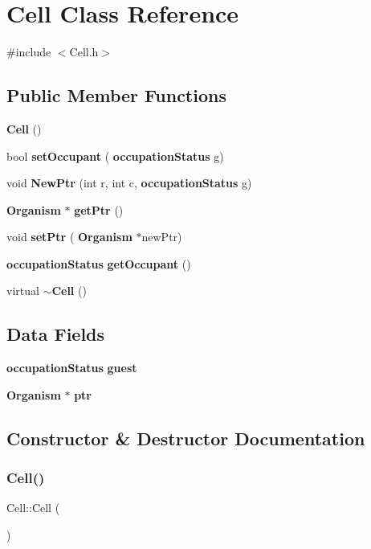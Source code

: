 \section{Cell Class Reference}
\label{classCell}


{\ttfamily \#include $<$Cell.\+h$>$}

\subsection*{Public Member Functions}
\begin{DoxyCompactItemize}
\item 
\textbf{ Cell} ()
\item 
bool \textbf{ set\+Occupant} (\textbf{ occupation\+Status} g)
\item 
void \textbf{ New\+Ptr} (int r, int c, \textbf{ occupation\+Status} g)
\item 
\textbf{ Organism} $\ast$ \textbf{ get\+Ptr} ()
\item 
void \textbf{ set\+Ptr} (\textbf{ Organism} $\ast$new\+Ptr)
\item 
\textbf{ occupation\+Status} \textbf{ get\+Occupant} ()
\item 
virtual \textbf{ $\sim$\+Cell} ()
\end{DoxyCompactItemize}
\subsection*{Data Fields}
\begin{DoxyCompactItemize}
\item 
\textbf{ occupation\+Status} \textbf{ guest}
\item 
\textbf{ Organism} $\ast$ \textbf{ ptr}
\end{DoxyCompactItemize}


\subsection{Constructor \& Destructor Documentation}
\mbox{\label{classCell_a394510643e8664cf12b5efaf5cb99f71}} 
\subsubsection{Cell()}
{\footnotesize\ttfamily Cell\+::\+Cell (\begin{DoxyParamCaption}{ }\end{DoxyParamCaption})}



